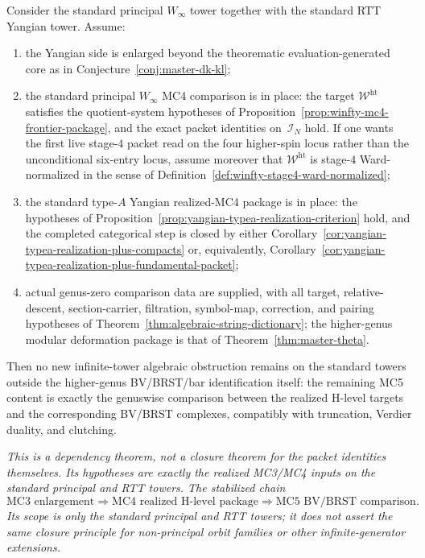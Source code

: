 \begin{proposition}
\label{prop:standard-tower-mc5-reduction}
Consider the standard principal
\texorpdfstring{$W_\infty$}{W_infty} tower together with the standard RTT
Yangian tower.  Assume:
\begin{enumerate}[label=\textup{(\roman*)}]
\item the Yangian side is enlarged beyond the theorematic
  evaluation-generated core as in
  Conjecture~\ref{conj:master-dk-kl};
\item the standard principal \texorpdfstring{$W_\infty$}{W_infty}
  MC4 comparison is in place: the target $\mathcal{W}^{\mathrm{ht}}$
  satisfies the quotient-system hypotheses of
  Proposition~\ref{prop:winfty-mc4-frontier-package}, and the exact
  packet identities on~$\mathcal{I}_N$ hold.  If one wants the first
  live stage-$4$ packet read on the four higher-spin locus rather than
  the unconditional six-entry locus, assume moreover that
  $\mathcal{W}^{\mathrm{ht}}$ is stage-$4$ Ward-normalized in the
  sense of Definition~\ref{def:winfty-stage4-ward-normalized};
\item the standard type-$A$ Yangian realized-MC4 package is in place:
  the hypotheses of
  Proposition~\ref{prop:yangian-typea-realization-criterion} hold, and
  the completed categorical step is closed by either
  Corollary~\ref{cor:yangian-typea-realization-plus-compacts} or,
  equivalently,
  Corollary~\ref{cor:yangian-typea-realization-plus-fundamental-packet};
\item actual genus-zero comparison data are supplied, with all target, relative-descent, section-carrier, filtration, symbol-map, correction, and pairing hypotheses of Theorem~\ref{thm:algebraic-string-dictionary};
  the higher-genus modular deformation package is that of Theorem~\ref{thm:master-theta}.
\end{enumerate}
Then no new infinite-tower algebraic obstruction remains on the
standard towers outside the higher-genus BV/BRST/bar identification
itself: the remaining MC5 content is exactly the genuswise comparison
between the realized H-level targets and the corresponding BV/BRST
complexes, compatibly with truncation, Verdier duality, and clutching.

\emph{This is a dependency theorem, not a closure theorem for the
packet identities themselves.  Its hypotheses are exactly the realized
MC3/MC4 inputs on the standard principal and RTT towers.  The
stabilized chain
\[
\text{MC3 enlargement}
\Longrightarrow
\text{MC4 realized H-level package}
\Longrightarrow
\text{MC5 BV/BRST comparison}.
\]
Its scope is only the standard principal and RTT towers; it does not
assert the same closure principle for non-principal orbit families or
other infinite-generator extensions.}
\end{proposition}

